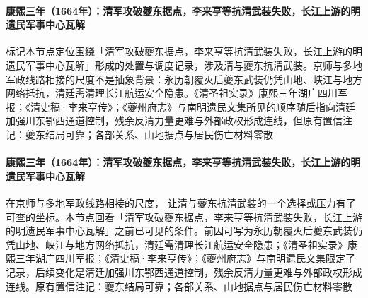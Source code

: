 \paragraph{康熙三年（1664年）：清军攻破夔东据点，李来亨等抗清武装失败，长江上游的明遗民军事中心瓦解}
 标记本节点定位围绕「清军攻破夔东据点，李来亨等抗清武装失败，长江上游的明遗民军事中心瓦解」形成的处置与调度记录，涉及清与夔东抗清武装。京师与多地军政线路相接的尺度不是抽象背景：永历朝覆灭后夔东武装仍凭山地、峡江与地方网络抵抗，清廷需清理长江航运安全隐患。《清圣祖实录》康熙三年湖广四川军报；《清史稿·李来亨传》；《夔州府志》与南明遗民文集所见的顺序随后指向清廷加强川东鄂西通道控制，残余反清力量更难与外部政权形成连线，但原有置信注记：夔东结局可靠；各部关系、山地据点与居民伤亡材料零散

\paragraph{康熙三年（1664年）：清军攻破夔东据点，李来亨等抗清武装失败，长江上游的明遗民军事中心瓦解}
在京师与多地军政线路相接的尺度， 让清与夔东抗清武装的一个选择或压力有了可查的坐标。本节点回看「清军攻破夔东据点，李来亨等抗清武装失败，长江上游的明遗民军事中心瓦解」之前已可见的条件。前因可写为永历朝覆灭后夔东武装仍凭山地、峡江与地方网络抵抗，清廷需清理长江航运安全隐患；《清圣祖实录》康熙三年湖广四川军报；《清史稿·李来亨传》；《夔州府志》与南明遗民文集限定了记录，后续变化是清廷加强川东鄂西通道控制，残余反清力量更难与外部政权形成连线。原有置信注记：夔东结局可靠；各部关系、山地据点与居民伤亡材料零散